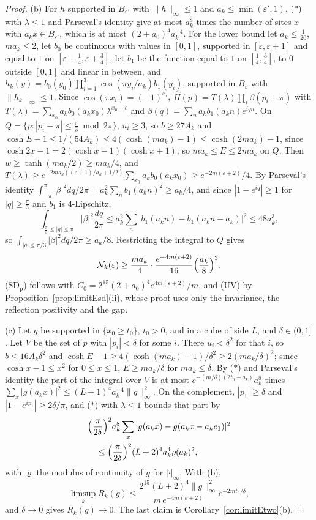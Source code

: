 \documentclass[aps,prd,twocolumn,superscriptaddress,nofootinbib,longbibliography,floatfix,amsmath,amssymb,10pt]{revtex4-2}
\theoremstyle{definition}
\theoremstyle{remark}
\begin{document}
\begin{proof}
(b) For $h$ supported in $B_{\varepsilon'}$ with $\|h\|_\infty\le1$ and
$a_k\le\min(\varepsilon',1)$, ($*$) with $\lambda\le1$ and Parseval's
identity give at most $a_k^8$ times the number of sites $x$ with $a_kx\in
B_{\varepsilon'}$, which is at most $(2+a_0)^4a_k^{-4}$. For the lower bound
let $a_k\le\frac1{20}$, $ma_k\le2$, let $b_0$ be continuous with values in
$[0,1]$, supported in $[\varepsilon,\varepsilon+1]$ and equal to $1$ on
$[\varepsilon+\frac14,\varepsilon+\frac34]$, let $b_1$ be the function equal
to $1$ on $[\frac14,\frac34]$, to $0$ outside $[0,1]$ and linear in between,
and $h_k(y)=b_0(y_0)\prod_{i=1}^3\cos(\pi y_i/a_k)b_1(y_i)$, supported in
$B_\varepsilon$ with $\|h_k\|_\infty\le1$. Since $\cos(\pi x_i)=(-1)^{x_i}$,
$\hat H(p)=T(\lambda)\prod_i\beta(p_i+\pi)$ with $T(\lambda)=\sum_{x_0}a_k
b_0(a_kx_0)\lambda^{x_0-c}$ and $\beta(q)=\sum_na_kb_1(a_kn)e^{iqn}$. On
$Q=\{p:|p_i-\pi|\le\frac\pi3\bmod2\pi\}$, $u_i\ge3$, so $b\ge27A_k$ and
$\cosh E-1\le1/(54A_k)\le4(\cosh(ma_k)-1)\le\cosh(2ma_k)-1$, since $\cosh
2x-1=2(\cosh x-1)(\cosh x+1)$; so $ma_k\le E\le2ma_k$ on $Q$. Then $w\ge
\tanh(ma_k/2)\ge ma_k/4$, and $T(\lambda)\ge e^{-2ma_k((\varepsilon+1)/a_k+
1/2)}\sum_{x_0}a_kb_0(a_kx_0)\ge e^{-2m(\varepsilon+2)}/4$. By Parseval's
identity $\int_{-\pi}^\pi|\beta|^2dq/2\pi=a_k^2\sum_nb_1(a_kn)^2\ge a_k/4$,
and since $|1-e^{iq}|\ge1$ for $|q|\ge\frac\pi3$ and $b_1$ is $4$-Lipschitz,
\[
\int_{\frac\pi3\le|q|\le\pi}|\beta|^2\frac{dq}{2\pi}\le a_k^2\sum_n|b_1(a_kn)
-b_1(a_kn-a_k)|^2\le48a_k^3 ,
\]
so $\int_{|q|\le\pi/3}|\beta|^2dq/2\pi\ge a_k/8$. Restricting the integral
to $Q$ gives
\[
\mathcal N_k(\varepsilon)\ge\frac{ma_k}4\cdot\frac{e^{-4m(\varepsilon+2)}}{16}\Bigl(\frac{a_k}8\Bigr)^3 .
\]
(SD$_{\mathrm p}$) follows with $C_0=2^{15}(2+a_0)^4e^{4m(\varepsilon+2)}/m$, and (UV) by Proposition~\ref{prop:limitEsd}(ii),
whose proof uses only the invariance, the reflection positivity and the gap.

(c) Let $g$ be supported in $\{x_0\ge t_0\}$, $t_0>0$, and in a cube of side
$L$, and $\delta\in(0,1]$. Let $V$ be the set of $p$ with $|p_i|<\delta$ for
some $i$. There $u_i<\delta^2$ for that $i$, so $b\le16A_k\delta^2$ and
$\cosh E-1\ge4(\cosh(ma_k)-1)/\delta^2\ge2(ma_k/\delta)^2$; since $\cosh x-1
\le x^2$ for $0\le x\le1$, $E\ge ma_k/\delta$ for $ma_k\le\delta$. By ($*$)
and Parseval's identity the part of the integral over $V$ is at most
$e^{-(m/\delta)(2t_0-a_k)}a_k^8$ times $\sum_x|g(a_kx)|^2\le(L+1)^4a_k^{-4}
\|g\|_\infty^2$. On the complement, $|p_1|\ge\delta$ and $|1-e^{ip_1}|\ge
2\delta/\pi$, and ($*$) with $\lambda\le1$ bounds that part by
\[
\begin{split}
&\Bigl(\frac\pi{2\delta}\Bigr)^2a_k^8\sum_x|g(a_kx)-g(a_kx-a_ke_1)|^2\\
&\quad\le\Bigl(\frac\pi{2\delta}\Bigr)^2(L+2)^4a_k^4\varrho(a_k)^2,
\end{split}
\]
with $\varrho$ the modulus of continuity of $g$ for $|\cdot|_\infty$. With
(b),
\[
\limsup_kR_k(g)\le\frac{2^{15}(L+2)^4\|g\|_\infty^2}{m\,e^{-4m(\varepsilon+
2)}}e^{-2mt_0/\delta},
\]
and $\delta\to0$ gives $R_k(g)\to0$. The last claim is
Corollary~\ref{cor:limitEtwo}(b).


\end{proof}
\end{document}
